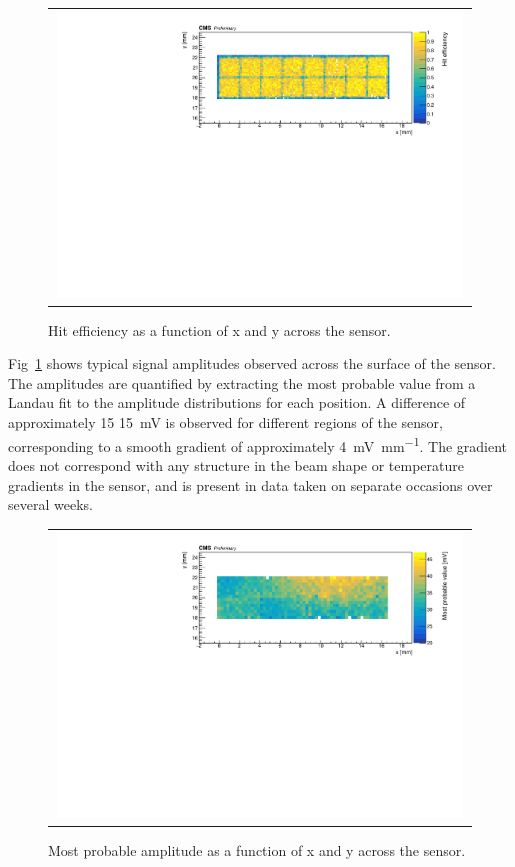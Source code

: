 \documentclass[preprint,1p]{elsarticle}
\begin{document}
\begin{figure}[htp] 
\centering {}
\begin{tabular}{c} 
\includegraphics[width=0.99\textwidth]{fig/efficiency_map_unscaled}  
\end{tabular} 
\caption{Hit efficiency as a function of x and y across the sensor.} 
\label{fig:eff_map} 
\end{figure} 


Fig~\ref{fig:eff_map} shows typical signal amplitudes observed across the surface of the sensor. The amplitudes are quantified by extracting the most probable value from a Landau fit to the amplitude distributions for each position. A difference of approximately 15 \SI{15}{\milli\volt} is observed for different regions of the sensor, corresponding to a smooth gradient of approximately \SI{4}{\milli\volt \per \milli \meter}. The gradient does not correspond with any structure in the beam shape or temperature gradients in the sensor, and is present in data taken on separate occasions over several weeks. 

\begin{figure}[htp] 
\centering 
\begin{tabular}{c} 
\includegraphics[width=0.99\textwidth]{fig/gain_map}  

\end{tabular} 
\caption{Most probable amplitude as a function of x and y across the sensor.} 
\label{fig:gain_map} 
\end{figure} 
\end{document}
